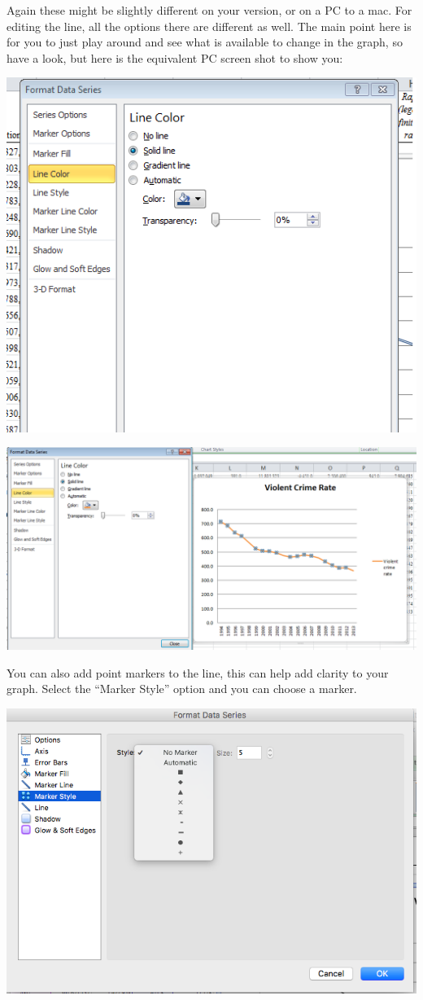 \documentclass[
]{book}
\begin{document}
Again these might be slightly different on your version, or on a PC to a mac. For editing the line, all the options there are different as well. The main point here is for you to just play around and see what is available to change in the graph, so have a look, but here is the equivalent PC screen shot to show you:

\includegraphics{imgs/pc_line_2.png}

\includegraphics{imgs/pc_edit_line.png}

You can also add point markers to the line, this can help add clarity to your graph. Select the ``Marker Style'' option and you can choose a marker.

\includegraphics{imgs/desc_line_markers.png}
\end{document}
